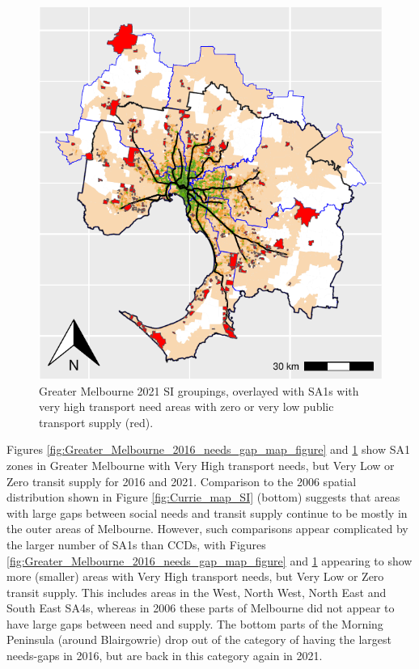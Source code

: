 \documentclass[preprint, 3p,
authoryear]{elsarticle} %
\begin{document}
\begin{figure}
\includegraphics[width=1\linewidth]{Leveraging_GTFS_to_assess_transit_supply_Transport_Geography_files/figure-latex/Greater_Melbourne_2021_needs_gap_map_figure-1} \caption{Greater Melbourne 2021 SI groupings, overlayed with SA1s with very high transport need areas with zero or very low public transport supply (red).}\label{fig:Greater_Melbourne_2021_needs_gap_map_figure}
\end{figure}

Figures \ref{fig:Greater_Melbourne_2016_needs_gap_map_figure} and
\ref{fig:Greater_Melbourne_2021_needs_gap_map_figure} show SA1 zones in
Greater Melbourne with Very High transport needs, but Very Low or Zero
transit supply for 2016 and 2021. Comparison to the 2006 spatial
distribution shown in Figure \ref{fig:Currie_map_SI} (bottom) suggests
that areas with large gaps between social needs and transit supply
continue to be mostly in the outer areas of Melbourne. However, such
comparisons appear complicated by the larger number of SA1s than CCDs,
with Figures \ref{fig:Greater_Melbourne_2016_needs_gap_map_figure} and
\ref{fig:Greater_Melbourne_2021_needs_gap_map_figure} appearing to show
more (smaller) areas with Very High transport needs, but Very Low or
Zero transit supply. This includes areas in the West, North West, North
East and South East SA4s, whereas in 2006 these parts of Melbourne did
not appear to have large gaps between need and supply. The bottom parts
of the Morning Peninsula (around Blairgowrie) drop out of the category
of having the largest needs-gaps in 2016, but are back in this category
again in 2021.
\end{document}
